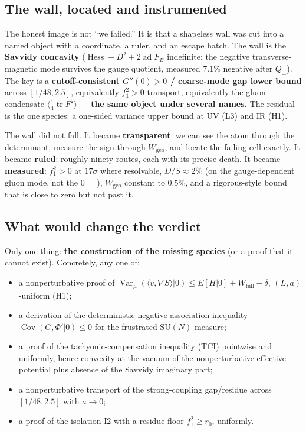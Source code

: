\figprobe

\subsection{The wall, located and instrumented}

The honest image is not ``we failed.'' It is that a shapeless wall was cut into a named object
with a coordinate, a ruler, and an escape hatch. The wall is the \textbf{Savvidy concavity}
($\operatorname{Hess}-D^2+2\operatorname{ad}F_B$ indefinite; the negative transverse-magnetic
mode survives the gauge quotient, measured $7.1\%$ negative after $Q_\perp$). The key is a
\textbf{cutoff-consistent $G''(0)>0$ / coarse-mode gap lower bound} across $[1/48,2.5]$,
equivalently $f_1^2>0$ transport, equivalently the gluon condensate
$\langle\tfrac14\operatorname{tr}F^2\rangle$ --- \textbf{the same object under several names.}
The residual is the one species: a one-sided variance upper bound at UV (L3) and IR (H1).

The wall did not fall. It became \textbf{transparent}: we can see the atom through the determinant,
measure the sign through $W_{\mathrm{geo}}$, and locate the failing cell exactly. It became
\textbf{ruled}: roughly ninety routes, each with its precise death. It became \textbf{measured}:
$f_1^2>0$ at $17\sigma$ where resolvable, $D/S\approx2\%$ (on the gauge-dependent gluon mode, not the $0^{++}$), $W_{\mathrm{geo}}$ constant to
$0.5\%$, and a rigorous-style bound that is close to zero but not past it.

\subsection{What would change the verdict}

Only one thing: \textbf{the construction of the missing species} (or a proof that it cannot
exist). Concretely, any one of:

\begin{itemize}
\item a nonperturbative proof of
  $\operatorname{Var}_\mu(\langle v,\nabla S\rangle|0)\le E[H|0]+W_{\mathrm{full}}-\delta$, $(L,a)$-uniform (H1);
\item a derivation of the deterministic negative-association inequality
  $\operatorname{Cov}(G,\Phi'|0)\le0$ for the frustrated $\mathrm{SU}(N)$ measure;
\item a proof of the tachyonic-compensation inequality (TCI) pointwise and uniformly, hence
  convexity-at-the-vacuum of the nonperturbative effective potential plus absence of the Savvidy
  imaginary part;
\item a nonperturbative transport of the strong-coupling gap/residue across $[1/48,2.5]$ with
  $a\to0$;
\item a proof of the isolation I2 with a residue floor $f_1^2\ge r_0$, uniformly.
\end{itemize}

